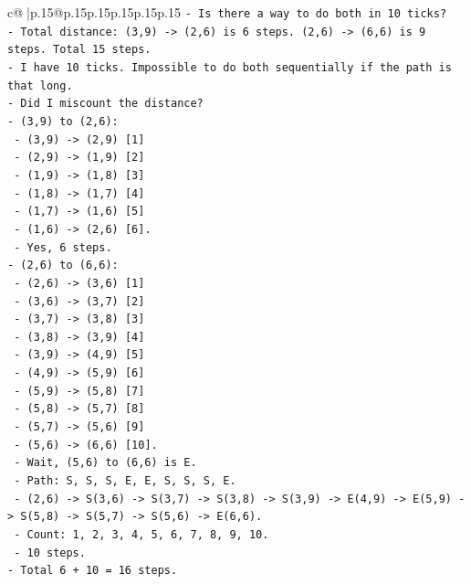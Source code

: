 \documentclass{article}
\begin{document}
{\begin{supertabular}{c@{$\;$}|p{.15\linewidth}@{}p{.15\linewidth}p{.15\linewidth}p{.15\linewidth}p{.15\linewidth}p{.15\linewidth}}
{{{\texttt{{-} Is there a way to do both in 10 ticks?} \\
\texttt{{-} Total distance: (3,9) {-}> (2,6) is 6 steps. (2,6) {-}> (6,6) is 9 steps. Total 15 steps.} \\
\texttt{{-} I have 10 ticks. Impossible to do both sequentially if the path is that long.} \\
\texttt{{-} Did I miscount the distance?} \\
\texttt{{-} (3,9) to (2,6):} \\
\texttt{  {-} (3,9) {-}> (2,9) {[}1{]}} \\
\texttt{  {-} (2,9) {-}> (1,9) {[}2{]}} \\
\texttt{  {-} (1,9) {-}> (1,8) {[}3{]}} \\
\texttt{  {-} (1,8) {-}> (1,7) {[}4{]}} \\
\texttt{  {-} (1,7) {-}> (1,6) {[}5{]}} \\
\texttt{  {-} (1,6) {-}> (2,6) {[}6{]}.} \\
\texttt{  {-} Yes, 6 steps.} \\
\texttt{{-} (2,6) to (6,6):} \\
\texttt{  {-} (2,6) {-}> (3,6) {[}1{]}} \\
\texttt{  {-} (3,6) {-}> (3,7) {[}2{]}} \\
\texttt{  {-} (3,7) {-}> (3,8) {[}3{]}} \\
\texttt{  {-} (3,8) {-}> (3,9) {[}4{]}} \\
\texttt{  {-} (3,9) {-}> (4,9) {[}5{]}} \\
\texttt{  {-} (4,9) {-}> (5,9) {[}6{]}} \\
\texttt{  {-} (5,9) {-}> (5,8) {[}7{]}} \\
\texttt{  {-} (5,8) {-}> (5,7) {[}8{]}} \\
\texttt{  {-} (5,7) {-}> (5,6) {[}9{]}} \\
\texttt{  {-} (5,6) {-}> (6,6) {[}10{]}.} \\
\texttt{  {-} Wait, (5,6) to (6,6) is E.} \\
\texttt{  {-} Path: S, S, S, E, E, S, S, S, E.} \\
\texttt{  {-} (2,6) {-}> S(3,6) {-}> S(3,7) {-}> S(3,8) {-}> S(3,9) {-}> E(4,9) {-}> E(5,9) {-}> S(5,8) {-}> S(5,7) {-}> S(5,6) {-}> E(6,6).} \\
\texttt{  {-} Count: 1, 2, 3, 4, 5, 6, 7, 8, 9, 10.} \\
\texttt{  {-} 10 steps.} \\
\texttt{{-} Total 6 + 10 = 16 steps.} \\
}}}
\end{supertabular}}
\end{document}
